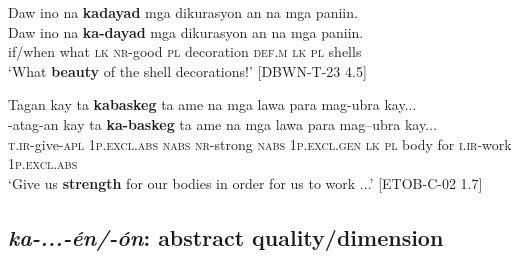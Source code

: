 \ea
\label{bkm:Ref447113409}
Daw  ino  na  \textbf{kadayad}  mga  dikurasyon  an  na  mga  paniin. \\\smallskip
 \gll Daw  ino  na  \textbf{ka-dayad}  mga  dikurasyon  an  na  mga  paniin. \\
if/when  what  \textsc{lk}  \textsc{nr}-good \textsc{pl}  decoration  \textsc{def.m}  \textsc{lk}  \textsc{pl}  shells \\
\glt ‘What \textbf{beauty} of the shell decorations!’ [DBWN-T-23 4.5]
\z

\newpage
\ea
\label{bkm:Ref441302833}
Tagan  kay  ta  \textbf{kabaskeg}  ta ame  na  mga  lawa para  mag-ubra  kay... \\\smallskip
 \gll \emptyset{}-atag-an  kay  ta  \textbf{ka-baskeg}  ta ame  na  mga  lawa para  mag--ubra  kay... \\
\textsc{t.ir}-give-\textsc{apl}  1\textsc{p.excl.abs}  \textsc{nabs}  \textsc{nr}-strong  \textsc{nabs}  1\textsc{p.excl.gen}  \textsc{lk}  \textsc{pl}  body for \textsc{i.ir}-work 1\textsc{p.excl.abs} \\
\glt ‘Give us \textbf{strength} for our bodies in order for us to work ...' [ETOB-C-02 1.7]
\z

\subsection{\textit{ka-...-én/-ón}: abstract quality/dimension}
\label{sec:ka-en}

